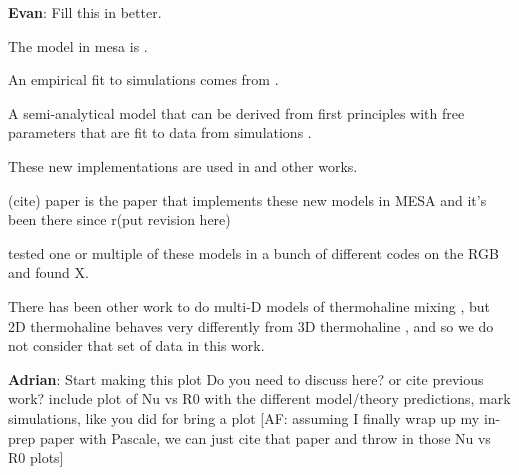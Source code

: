 \textbf{Evan}: Fill this in better.

The model in mesa \citep{mesa2} is \citet{ulrich_1972, kippenhahn_etal_1980}.

An empirical fit to simulations comes from \citet{traxler_etal_2011}.

A semi-analytical model that can be derived from first principles with free parameters that are fit to data from simulations \citet{brown_etal_2013}.

These new implementations are used in \citep{bauer_bildsten_2019} and other works.

(cite) paper is the paper that implements these new models in MESA and it's been there since r(put revision here)

\citet{lattanzio_etal_2015} tested one or multiple of these models in a bunch of different codes on the RGB and found X.

There has been other work to do multi-D models of thermohaline mixing \citep{denissenkov_2010, denissenkov_merryfield_2011}, but 2D thermohaline behaves very differently from 3D thermohaline \citep{garaud_brummell_2015}, and so we do not consider that set of data in this work.

\textbf{Adrian}: Start making this plot
Do you need to discuss here? or cite previous work? include plot of Nu vs R0 with the different model/theory predictions, mark simulations, like you did for bring a plot [AF: assuming I finally wrap up my in-prep paper with Pascale, we can just cite that paper and throw in those Nu vs R0 plots]